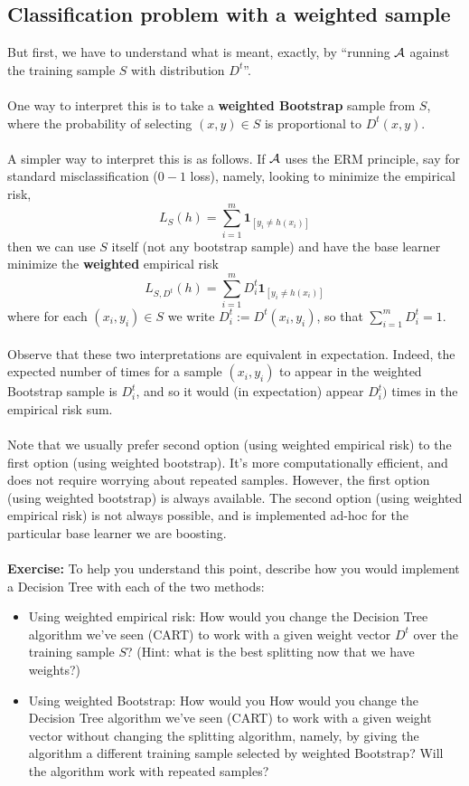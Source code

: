 \subsection{Classification problem with a weighted sample}

But first, we have to understand  what is meant, exactly,  by ``running $\mathcal{A}$
against the training sample $S$ with distribution $D^t$''.  
\\~\\
One way to interpret this is to take a {\bf weighted Bootstrap} sample from $S$,
where the probability of selecting $(x,y)\in S$ is proportional to $D^t(x,y)$. 
\\~\\
A simpler way to interpret this is as follows. If $\mathcal{A}$ uses the ERM principle,
say for standard misclassification ($0-1$ loss),
namely, looking to minimize the empirical risk,
\[
  L_S(h) = \sum_{i=1}^m \mathbf{1}_{[y_i \neq h(x_i)]} 
\]
then we can use $S$ itself (not
any bootstrap sample) and have the base learner 
minimize the {\bf weighted} empirical risk
\[
  L_{S,D^t}(h) = \sum_{i=1}^m D^t_i\mathbf{1}_{[y_i \neq h(x_i)]} 
\]
where for each $(x_i,y_i)\in S$ we write $D^t_i := D^t(x_i,y_i)$, so that  
$\sum_{i=1}^m D^t_i =1$.
\\~\\
Observe that these two interpretations are equivalent in expectation. Indeed,
the expected number of times for a sample $(x_i,y_i)$ to appear in the weighted
Bootstrap sample is $D^t_i$, and so it would (in expectation) appear $D^t_i)$
times in the empirical risk sum. 
\\~\\
Note that we usually prefer second option (using weighted empirical risk) to the
first option (using weighted bootstrap). 
It's more computationally efficient, and does not require worrying about
repeated samples.
However, the first option (using weighted bootstrap) is always available. The
second option (using weighted empirical risk) is not always possible, and is
implemented ad-hoc for the particular base learner we are boosting.
\\~\\
{\bf Exercise:}
To help you understand this point, describe how you would implement a Decision
Tree with each of the two methods:
\begin{itemize}
  \item Using weighted empirical risk: How would you change the Decision Tree
    algorithm we've seen (CART) to work with a given weight vector $D^t$ over
    the training sample $S$? (Hint: what is the best splitting now that we have
    weights?)
  \item Using weighted Bootstrap: How would you How would you change the Decision Tree
    algorithm we've seen (CART)  to work with a given weight vector without
    changing the splitting algorithm, namely, by giving the algorithm a
    different training sample selected by weighted Bootstrap? Will the algorithm
    work with repeated samples?
\end{itemize}
